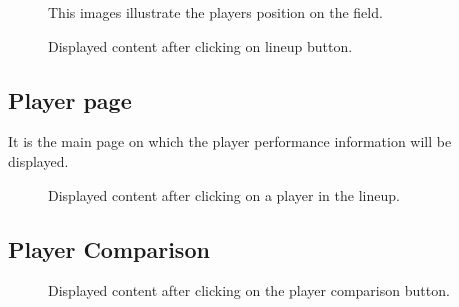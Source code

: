\documentclass[letterpaper,10pt,english]{jupyterBook}
\let\sphinxpxdimen\pdfpxdimen\else\newdimen\sphinxpxdimen
\begin{document}
\begin{figure}[htbp]
\centering
\capstart

\noindent\sphinxincludegraphics[height=300\sphinxpxdimen]{{positions}.png}
\caption{This images illustrate the players position on the field.}\label{\detokenize{Chap3/Chap3:positions-fig}}\end{figure}

\begin{figure}[htbp]
\centering
\capstart

\noindent{}
\caption{Displayed content after clicking on line\sphinxhyphen{}up button.}\label{\detokenize{Chap3/Chap3:lineuppage-fig}}\end{figure}


\subsection{Player page}
\label{\detokenize{Chap3/Chap3:player-page}}
\sphinxAtStartPar
It is the main page on which the player performance information will be displayed.

\begin{figure}[htbp]
\centering
\capstart

\noindent{}
\caption{Displayed content after clicking on a player in the line\sphinxhyphen{}up.}\label{\detokenize{Chap3/Chap3:playerpage-fig}}\end{figure}


\subsection{Player Comparison}
\label{\detokenize{Chap3/Chap3:player-comparison}}
\begin{figure}[htbp]
\centering
\capstart

\noindent{}
\caption{Displayed content after clicking on the player comparison button.}\label{\detokenize{Chap3/Chap3:playercomp-fig}}\end{figure}







\renewcommand{\indexname}{Index}
\printindex
\end{document}
